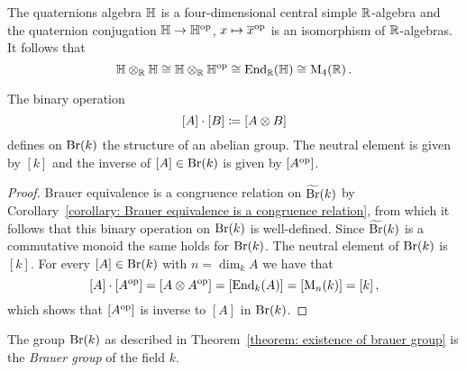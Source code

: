 

\begin{example}
  The quaternions algebra $\mathbb{H}$ is a four-dimensional central simple $\mathbb{R}$-algebra and the quaternion conjugation $\mathbb{H} \to \mathbb{H}^{\operatorname{op}}$, $x \mapsto \overline{x}^{\operatorname{op}}$ is an isomorphism of $\mathbb{R}$-algebras.
  It follows that
  \[
          \mathbb{H} \mathbin{\otimes}_{\mathbb{R}} \mathbb{H}
    \cong \mathbb{H} \mathbin{\otimes}_{\mathbb{R}} \mathbb{H}^{\operatorname{op}}
    \cong \operatorname{End}_{\mathbb{R}}(\mathbb{H})
    \cong \operatorname{M}_4(\mathbb{R}) \,.
  \]
\end{example}


\begin{theorem}
  \label{theorem: existence of brauer group}
  The binary operation
  \[
              [A] \cdot [B]
    \coloneqq  [A \mathbin{\otimes} B]
  \]
  defines on $\operatorname{Br}(k)$ the structure of an abelian group.
  The neutral element is given by $[k]$ and the inverse of $[A] \in \operatorname{Br}(k)$ is given by $[A^{\operatorname{op}}]$.
\end{theorem}


\begin{proof}
  Brauer equivalence is a congruence relation on $\widetilde{\operatorname{Br}}(k)$ by Corollary~\ref{corollary: Brauer equivalence is a congruence relation}, from which it follows that this binary operation on $\operatorname{Br}(k)$ is well-defined.
  Since $\widetilde{\operatorname{Br}}(k)$ is a commutative monoid the same holds for $\operatorname{Br}(k)$.
  The neutral element of $\operatorname{Br}(k)$ is $[k]$.
  For every $[A] \in \operatorname{Br}(k)$ with $n = \dim_k A$ we have that
  \[
      [A] \cdot [A^{\operatorname{op}}]
    = [A \mathbin{\otimes} A^{\operatorname{op}}]
    = [\operatorname{End}_k(A)]
    = [\operatorname{M}_n(k)]
    = [k] \,,
  \]
  which shows that $[A^{\operatorname{op}}]$ is inverse to $[A]$ in $\operatorname{Br}(k)$.
\end{proof}


\begin{definition}
  The group $\operatorname{Br}(k)$ as described in Theorem~\ref{theorem: existence of brauer group} is the \emph{Brauer group} of the field $k$.
\end{definition}


